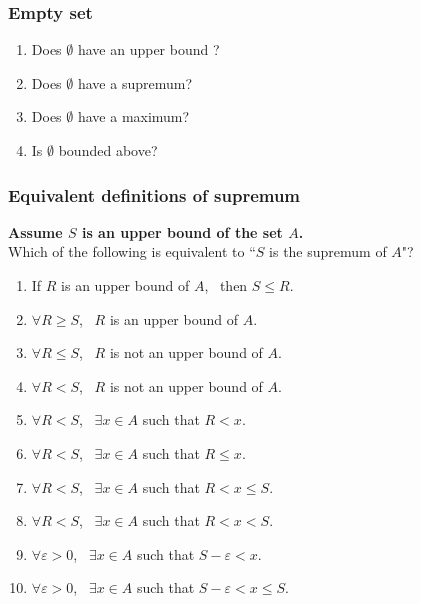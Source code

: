 \documentclass[14pt]{beamer}
\begin{document}
\begin{frame}[t]
	\frametitle{Empty set}

	\begin{enumerate}
		\item Does $\emptyset$ have an upper bound ?

		\item Does $\emptyset$ have a supremum?

		\item Does $\emptyset$ have a maximum?

		\item Is $\emptyset$ bounded above?
	\end{enumerate}
\end{frame}

\begin{frame}[t]
	\fontsize{13}{13}\selectfont
	\frametitle{Equivalent definitions of supremum}

	{\bfseries Assume $S$ is an upper bound of the set $A$.} \\ Which of the following
	is equivalent to ``$S$ is the supremum of $A$"?
	\vspace{.2cm}
	\begin{enumerate}
		\item If $R$ is an upper bound of $A$, \, then $S \leq R$.
			\vspace{.2cm}

		\item $\displaystyle \forall R \geq S$, \, $R$ is an upper bound of $A$.

		\item $\displaystyle \forall R \leq S$, \, $R$ is not an upper bound of $A$.

		\item $\displaystyle \forall R < S$, \, $R$ is not an upper bound of $A$.
			\vspace{.2cm}

		\item $\displaystyle \forall R < S$, \, $\displaystyle \exists x \in A$ \;
			such that \; $\displaystyle R < x$.

		\item $\displaystyle \forall R < S$, \, $\displaystyle \exists x \in A$ \;
			such that \; $\displaystyle R \leq x$.

		\item $\displaystyle \forall R < S$, \, $\displaystyle \exists x \in A$ \;
			such that \; $\displaystyle R < x \leq S$.

		\item $\displaystyle \forall R < S$, \, $\displaystyle \exists x \in A$ \;
			such that \; $\displaystyle R < x < S$.
			\vspace{.2cm}

		\item $\displaystyle \forall \varepsilon>0$, \; \,
			$\displaystyle \exists x \in A$ \; such that \;
			$\displaystyle S - \varepsilon < x$.

		\item $\displaystyle \forall \varepsilon>0$, \; \,
			$\displaystyle \exists x \in A$ \; such that \;
			$\displaystyle S - \varepsilon < x \leq S$.
	\end{enumerate}
\end{frame}
\end{document}
